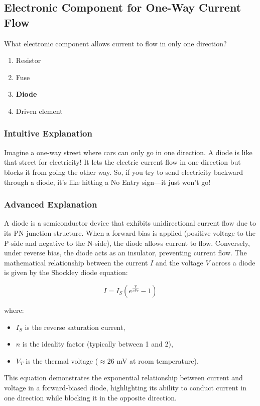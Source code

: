 \subsection{Electronic Component for One-Way Current Flow}
\label{T6B02}

\begin{tcolorbox}[colback=gray!10!white,colframe=black!75!black,title=T6B02]
What electronic component allows current to flow in only one direction?
\begin{enumerate}[label=\Alph*]
    \item Resistor
    \item Fuse
    \item \textbf{Diode}
    \item Driven element
\end{enumerate}
\end{tcolorbox}

\subsubsection{Intuitive Explanation}
Imagine a one-way street where cars can only go in one direction. A diode is like that street for electricity! It lets the electric current flow in one direction but blocks it from going the other way. So, if you try to send electricity backward through a diode, it’s like hitting a No Entry sign—it just won’t go!

\subsubsection{Advanced Explanation}
A diode is a semiconductor device that exhibits unidirectional current flow due to its PN junction structure. When a forward bias is applied (positive voltage to the P-side and negative to the N-side), the diode allows current to flow. Conversely, under reverse bias, the diode acts as an insulator, preventing current flow. The mathematical relationship between the current \( I \) and the voltage \( V \) across a diode is given by the Shockley diode equation:

\[
I = I_S \left( e^{\frac{V}{nV_T}} - 1 \right)
\]

where:
\begin{itemize}
    \item \( I_S \) is the reverse saturation current,
    \item \( n \) is the ideality factor (typically between 1 and 2),
    \item \( V_T \) is the thermal voltage (\( \approx 26 \) mV at room temperature).
\end{itemize}

This equation demonstrates the exponential relationship between current and voltage in a forward-biased diode, highlighting its ability to conduct current in one direction while blocking it in the opposite direction.

